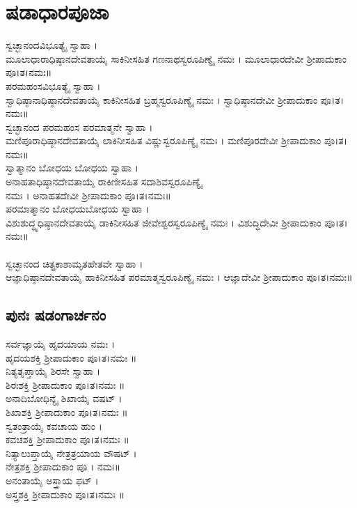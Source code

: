 \section{ಷಡಾಧಾರಪೂಜಾ}
 ಸ್ವಚ್ಛಾನಂದವಿಭೂತ್ಯೈ ಸ್ವಾಹಾ ।\\ ಮೂಲಾಧಾರಾಧಿಷ್ಠಾನದೇವತಾಯೈ ಸಾಕಿನೀಸಹಿತ ಗಣನಾಥಸ್ವರೂಪಿಣ್ಯೈ ನಮಃ ।  ಮೂಲಾಧಾರದೇವೀ ಶ್ರೀಪಾದುಕಾಂ ಪೂ।ತ।ನಮಃ॥\\
 ಪರಮಹಂಸವಿಭೂತ್ಯೈ ಸ್ವಾಹಾ ।\\ ಸ್ವಾಧಿಷ್ಠಾನಾಧಿಷ್ಠಾನದೇವತಾಯೈ  ಕಾಕಿನೀಸಹಿತ  ಬ್ರಹ್ಮಸ್ವರೂಪಿಣ್ಯೈ ನಮಃ । ಸ್ವಾಧಿಷ್ಠಾನದೇವೀ ಶ್ರೀಪಾದುಕಾಂ ಪೂ।ತ।ನಮಃ॥\\
ಸ್ವಚ್ಛಾನಂದ ಪರಮಹಂಸ ಪರಮಾತ್ಮನೇ ಸ್ವಾಹಾ ।\\ ಮಣಿಪೂರಾಧಿಷ್ಠಾನದೇವತಾಯೈ ಲಾಕಿನೀಸಹಿತ ವಿಷ್ಣುಸ್ವರೂಪಿಣ್ಯೈ ನಮಃ । ಮಣಿಪೂರದೇವೀ ಶ್ರೀಪಾದುಕಾಂ ಪೂ।ತ।ನಮಃ॥\\
 ಸ್ವಾತ್ಮಾನಂ ಬೋಧಯ ಬೋಧಯ ಸ್ವಾಹಾ ।\\ ಅನಾಹತಾಧಿಷ್ಠಾನದೇವತಾಯೈ ರಾಕಿಣೀಸಹಿತ ಸದಾಶಿವಸ್ವರೂಪಿಣ್ಯೈ\\ ನಮಃ । ಅನಾಹತದೇವೀ ಶ್ರೀಪಾದುಕಾಂ ಪೂ।ತ।ನಮಃ॥\\
ಪರಮಾತ್ಮಾನಂ ಬೋಧಯಬೋಧಯ ಸ್ವಾಹಾ ।\\ ವಿಶುಶುದ್ಧ್ಯಧಿಷ್ಠಾನದೇವತಾಯೈ ಡಾಕಿನೀಸಹಿತ ಜೀವೇಶ್ವರಸ್ವರೂಪಿಣ್ಯೈ ನಮಃ । ವಿಶುದ್ಧಿದೇವೀ ಶ್ರೀಪಾದುಕಾಂ ಪೂ।ತ।ನಮಃ॥\\
\\ ಸ್ವಚ್ಛಾನಂದ ಚಿತ್ಪ್ರಕಾಶಾಮೃತಹೇತವೇ ಸ್ವಾಹಾ ।\\ ಆಜ್ಞಾಧಿಷ್ಠಾನದೇವತಾಯೈ ಹಾಕಿನೀಸಹಿತ ಪರಮಾತ್ಮಸ್ವರೂಪಿಣ್ಯೈ ನಮಃ । ಆಜ್ಞಾದೇವೀ ಶ್ರೀಪಾದುಕಾಂ ಪೂ।ತ।ನಮಃ॥
\subsection{ಪುನಃ ಷಡಂಗಾರ್ಚನಂ}
 ಸರ್ವಜ್ಞಾಯೈ ಹೃದಯಾಯ ನಮಃ ।\\ ಹೃದಯಶಕ್ತಿ ಶ್ರೀಪಾದುಕಾಂ ಪೂ।ತ।ನಮಃ ॥\\
 ನಿತ್ಯತೃಪ್ತಾಯೈ ಶಿರಸೇ ಸ್ವಾಹಾ ।\\ ಶಿರಃಶಕ್ತಿ ಶ್ರೀಪಾದುಕಾಂ ಪೂ।ತ।ನಮಃ ॥\\
 ಅನಾದಿಬೋಧಿನ್ಯೈ ಶಿಖಾಯೈ ವಷಟ್ ।\\ ಶಿಖಾಶಕ್ತಿ ಶ್ರೀಪಾದುಕಾಂ ಪೂ।ತ।ನಮಃ ॥\\
 ಸ್ವತಂತ್ರಾಯೈ ಕವಚಾಯ ಹುಂ ।\\ ಕವಚಶಕ್ತಿ ಶ್ರೀಪಾದುಕಾಂ ಪೂ।ತ।ನಮಃ ॥\\
 ನಿತ್ಯಾಲುಪ್ತಾಯೈ ನೇತ್ರತ್ರಯಾಯ ವೌಷಟ್ ।\\ ನೇತ್ರಶಕ್ತಿ ಶ್ರೀಪಾದುಕಾಂ ಪೂ । ನಮಃ॥\\
 ಅನಂತಾಯೈ ಅಸ್ತ್ರಾಯ ಫಟ್ ।\\ ಅಸ್ತ್ರಶಕ್ತಿ ಶ್ರೀಪಾದುಕಾಂ ಪೂ।ತ।ನಮಃ ॥

